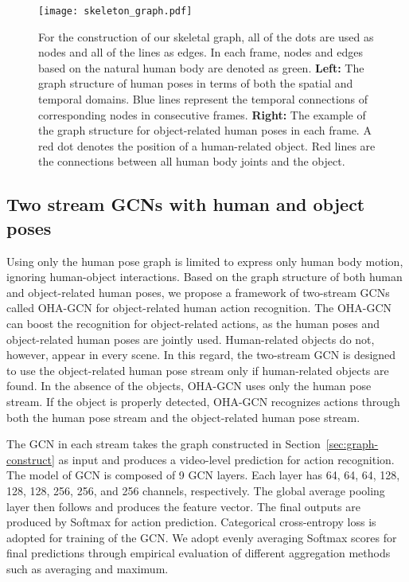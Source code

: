 \documentclass[10pt,twocolumn,letterpaper]{article}
\begin{document}
\begin{figure}[t]
\begin{center}
   \texttt{[image: skeleton\_graph.pdf]}
\end{center}
   \caption{ For the construction of our skeletal graph, all of the dots are used as nodes and all of the lines as edges. In each frame, nodes and edges based on the natural human body are denoted as green.   \textbf{Left:} The graph structure of human poses in terms of both the spatial and temporal domains. Blue lines represent the temporal connections of corresponding nodes in consecutive frames.
   \textbf{Right:} The example of the graph structure for object-related human poses in each frame. 
   A red dot denotes the position of a human-related object. 
   Red lines are the connections between all human body joints and the object.
   }
\label{fig:skeleton_graph}
\end{figure}



\subsection{Two stream GCNs with human and object poses}
\label{sec:GCNs}
Using only the human pose graph is limited to express only human body motion, ignoring human-object interactions.
Based on the graph structure of both human and object-related human poses, we propose a framework of two-stream GCNs called OHA-GCN for object-related human action recognition.
The OHA-GCN can boost the recognition for object-related actions, as the human poses and object-related human poses are jointly used.
Human-related objects do not, however, appear in every scene. 
In this regard, the two-stream GCN is designed to use the object-related human pose stream only if human-related objects are found.
In the absence of the objects, OHA-GCN uses only the human pose stream. If the object is properly detected, OHA-GCN recognizes actions through both the human pose stream and the object-related human pose stream.


The GCN in each stream takes the graph constructed in Section~\ref{sec:graph-construct} as input and produces a video-level prediction for action recognition.
The model of GCN is composed of 9 GCN layers. Each layer has 64, 64, 64, 128, 128, 128, 256, 256, and 256 channels, respectively.
The global average pooling layer then follows and produces the feature vector. The final outputs are produced by Softmax for action prediction.
Categorical cross-entropy loss is adopted for training of the GCN.
We adopt evenly averaging Softmax scores for final predictions through empirical evaluation of different aggregation methods such as averaging and maximum.
\end{document}

